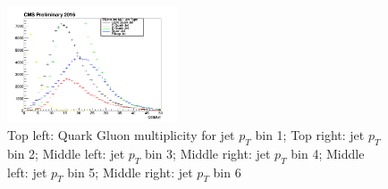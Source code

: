 \begin{figure}[htbp]
\begin{center}
  \includegraphics[width=0.45\textwidth]{sections/mc4/TopTagger/figures/_b_qgmultjetptbin5_.png}
 \end{center}
 \caption{Top left: Quark Gluon multiplicity for jet $p_{T}$ bin 1; Top right: jet $p_{T}$ bin 2; Middle left: jet $p_{T}$ bin 3; Middle right: jet $p_{T}$ bin 4; Middle left: jet $p_{T}$ bin 5; Middle right: jet $p_{T}$ bin 6}
 \label{fig:c4ttqgmultjetpt}
\end{figure}

